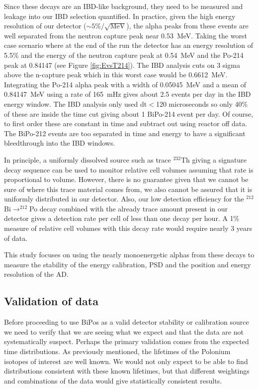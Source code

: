 Since these decays are an IBD-like background, they need to be measured and leakage into our IBD selection quantified. In practice, given the high energy resolution of our detector ($\sim5\%/\sqrt{\textrm{MeV}}$), the alpha peaks from these events are well separated from the neutron capture peak near 0.53~MeV. Taking the worst case scenario where at the end of the run the detector has an energy resolution of 5.5\% and the energy of the neutron capture peak at 0.54~MeV and the Po-214 peak at 0.84147 (see Figure \ref{fig:EvsT214}). The IBD analysis cuts on 3 sigma above the n-capture peak which in this worst case would be 0.6612~MeV. Integrating the Po-214 alpha peak with a width of 0.05045~MeV and a mean of 0.84147~MeV using a rate of 165~mHz gives about 2.5 events per day in the IBD energy window. The IBD analysis only used  dt$<$120 microseconds so only 40\% of these are inside the time cut giving about 1 BiPo-214 event per day. Of course, to first order these are constant in time and subtract out using reactor off data. The BiPo-212 events are too separated in time and energy to have a significant bleedthrough into the IBD windows.

In principle, a uniformly dissolved source such as trace $^{232}$Th giving a signature decay sequence can be used to monitor relative cell volumes assuming that rate is proportional to volume. However, there is no guarantee given that we cannot be sure of where this trace material comes from, we also cannot be assured that it is uniformly distributed in our detector. Also, our low detection efficiency for the $^{212}$Bi$\rightarrow^{212}$Po decay combined with the already trace amount present in our detector gives a detection rate per cell of less than one decay per hour. A 1\% measure of relative cell volumes with this decay rate would require nearly 3 years of data.

This study focuses on using the nearly monoenergetic alphas from these decays to measure the stability of the energy calibration, PSD and the position and energy resolution of the AD. 

\subsection{Validation of data}
Before proceeding to use BiPos as a valid detector stability or calibration source we need to verify that we are seeing what we expect and that the data are not systematically suspect. Perhaps the primary validation comes from the expected time distributions. As previously mentioned, the lifetimes of the Polonium isotopes of interest are well known. We would not only expect to be able to find distributions consistent with these known lifetimes, but that different weightings and combinations of the data would give statistically consistent results. 


